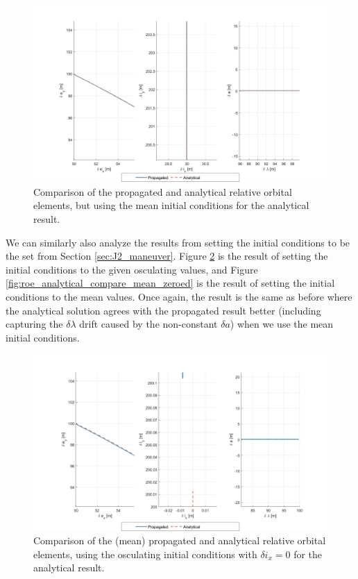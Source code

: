 \begin{figure}[htpb]
    \centering
    \includegraphics[width=0.8\linewidth]{sim/figures/PS4/ROE_analytical_compare_mean_IC2_SV2.png}
    \caption{Comparison of the propagated and analytical relative orbital elements, but using the mean initial conditions for the analytical result.}
\label{fig:roe_analytical_compare_mean}
\end{figure}

We can similarly also analyze the results from setting the initial conditions to be the set from Section \ref{sec:J2_maneuver}. Figure \ref{fig:roe_analytical_compare_osc_zeroed} is the result of setting the initial conditions to the given osculating values, and Figure \ref{fig:roe_analytical_compare_mean_zeroed} is the result of setting the initial conditions to the mean values. Once again, the result is the same as before where the analytical solution agrees with the propagated result better (including capturing the $\delta \lambda$ drift caused by the non-constant $\delta a$) when we use the mean initial conditions.

\begin{figure}[htpb]
    \centering
    \includegraphics[width=0.8\linewidth]{sim/figures/PS4/ROE_analytical_compare_given_IC3_SV2.png}
    \caption{Comparison of the (mean) propagated and analytical relative orbital elements, using the osculating initial conditions with $\delta i_x = 0$ for the analytical result.}
\label{fig:roe_analytical_compare_osc_zeroed}
\end{figure}

